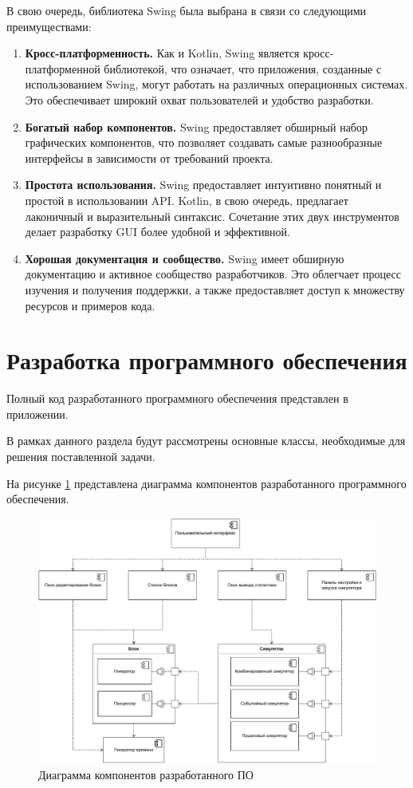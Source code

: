 В свою очередь, библиотека Swing была выбрана в связи со следующими преимуществами:

\begin{enumerate}
	\item \textbf{Кросс-платформенность.} Как и Kotlin, Swing является кросс-платформенной библиотекой, что означает, что приложения, созданные с использованием Swing, могут работать на различных операционных системах. Это обеспечивает широкий охват пользователей и удобство разработки.
	
	\item \textbf{Богатый набор компонентов.} Swing предоставляет обширный набор графических компонентов, что позволяет создавать самые разнообразные интерфейсы в зависимости от требований проекта.

	\item \textbf{Простота использования.} Swing предоставляет интуитивно понятный и простой в использовании API. Kotlin, в свою очередь, предлагает лаконичный и выразительный синтаксис. Сочетание этих двух инструментов делает разработку GUI более удобной и эффективной.
	
	\item \textbf{Хорошая документация и сообщество.} Swing имеет обширную документацию и активное сообщество разработчиков. Это облегчает процесс изучения и получения поддержки, а также предоставляет доступ к множеству ресурсов и примеров кода.
\end{enumerate}


\section{Разработка программного обеспечения}

Полный код разработанного программного обеспечения представлен в приложении.

В рамках данного раздела будут рассмотрены основные классы, необходимые для решения поставленной задачи.

\clearpage
На рисунке \ref{img:uml} представлена диаграмма компонентов разработанного программного обеспечения.

\begin{figure}[h!btp]
	\centering
	\includegraphics[width=0.7\columnwidth]{inc/img/uml.pdf}
	\caption{Диаграмма компонентов разработанного ПО}
	\label{img:uml}	
\end{figure}


